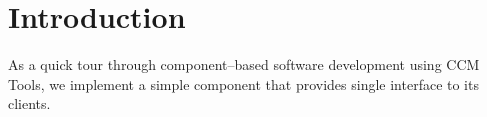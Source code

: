 \section{Introduction}
\label{section:Introduction}

As a quick tour through component--based software development using CCM Tools,
we implement a simple component that provides single interface to its clients.

\newpage


